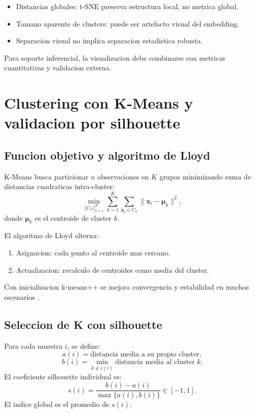 \documentclass[12pt,a4paper,oneside]{report}
\begin{document}
\begin{itemize}
\item Distancias globales: t-SNE preserva estructura local, no metrica global.
\item Tamano aparente de clusters: puede ser artefacto visual del embedding.
\item Separacion visual no implica separacion estadistica robusta.
\end{itemize}

Para soporte inferencial, la visualizacion debe combinarse con metricas cuantitativas y validacion externa.

\chapter{Clustering con K-Means y validacion por silhouette}

\section{Funcion objetivo y algoritmo de Lloyd}

K-Means busca particionar $n$ observaciones en $K$ grupos minimizando suma de distancias cuadraticas intra-cluster:
\[
\min_{\{C_k\}_{k=1}^{K}} \sum_{k=1}^{K}\sum_{\mathbf{x}_i\in C_k} \|\mathbf{x}_i-\boldsymbol{\mu}_k\|^2,
\]
donde $\boldsymbol{\mu}_k$ es el centroide de cluster $k$.

El algoritmo de Lloyd alterna:
\begin{enumerate}
\item Asignacion: cada punto al centroide mas cercano.
\item Actualizacion: recalculo de centroides como media del cluster.
\end{enumerate}

Con inicializacion k-means++ se mejora convergencia y estabilidad en muchos escenarios \cite{lloyd1982,macqueen1967}.

\section{Seleccion de K con silhouette}

Para cada muestra $i$, se define:
\[
a(i)=\text{distancia media a su propio cluster},
\]
\[
b(i)=\min_{k\ne c(i)}\text{distancia media al cluster }k.
\]
El coeficiente silhouette individual es:
\[
s(i)=\frac{b(i)-a(i)}{\max\{a(i),b(i)\}} \in [-1,1].
\]
El indice global es el promedio de $s(i)$.
\end{document}
